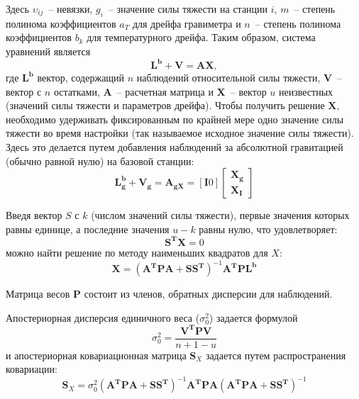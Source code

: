 Здесь $\upsilon_{ij}$~-- невязки, $g_i$~-- значение силы тяжести на станции $i$,
$m$~-- степень полинома коэффициентов $a_T$ для дрейфа гравиметра и $n$~--
степень полинома коэффициентов $b_k$ для температурного дрейфа. Таким образом,
система уравнений является
\begin{equation}
    \mathbf{L}^{\mathbf{b}} + \mathbf{V} = \mathbf{A}\mathbf{X},
\end{equation}
где $\mathbf{L}^{\mathbf{b}}$ вектор, содержащий $n$ наблюдений относительной
силы тяжести, $\mathbf{V}$~-- вектор с $n$ остатками, $\mathbf{A}$~-- расчетная
матрица и $\mathbf{X}$~-- вектор $u$ неизвестных (значений силы тяжести и
параметров дрейфа). Чтобы получить решение $\mathbf{X}$, необходимо удерживать
фиксированным по крайней мере одно значение силы тяжести во время настройки (так
называемое исходное значение силы тяжести).  Здесь это делается путем добавления
наблюдений за абсолютной гравитацией (обычно равной нулю) на базовой станции:
\begin{equation}
    \mathbf{L}^{\mathbf{b}}_{\mathbf{g}} + \mathbf{V}_{\mathbf{g}} =
    \mathbf{A}_{\mathbf{g}\mathbf{X}} =
    \left[\mathbf{I}0\right]
    \left[
        \begin{aligned}
            \mathbf{X}_{\mathbf{g}}\\
            \mathbf{X}_{\mathbf{I}}
        \end{aligned}
    \right]
\end{equation}

Введя вектор $S$ с $k$ (числом значений силы тяжести), первые значения которых равны
единице, а последние значения $u-k$ равны нулю, что удовлетворяет:
\begin{equation}
    \mathbf{S}^{\mathbf{T}}\mathbf{X}=0
\end{equation}
можно найти решение по методу наименьших квадратов для $X$:
\begin{equation}
    \mathbf{X} = \left(\mathbf{A}^{\mathbf{T}}\mathbf{P}\mathbf{A} + \mathbf{S}\mathbf{S}^{\mathbf{T}}\right)^{-1}\mathbf{A}^{\mathbf{T}}\mathbf{P}\mathbf{L}^{\mathbf{b}}
\end{equation}

Матрица весов $\mathbf{P}$ состоит из членов, обратных дисперсии для наблюдений.

Апостериорная дисперсия единичного веса ($\sigma^2_0$) задается формулой
\begin{equation}
    \sigma^2_0 = \frac{\mathbf{V}^{\mathbf{T}}\mathbf{P}\mathbf{V}}{n+1-u}
\end{equation}
и апостериорная ковариационная матрица $\mathbf{S}_X$ задается путем
распространения ковариации:
\begin{equation}
    \mathbf{S}_X = \sigma^2_0\left(\mathbf{A}^{\mathbf{T}}\mathbf{P}\mathbf{A}+\mathbf{S}\mathbf{S}^{\mathbf{T}}\right)^{-1}
    \mathbf{A}^{\mathbf{T}}\mathbf{P}\mathbf{A}\left(\mathbf{A}^{\mathbf{T}}\mathbf{P}\mathbf{A}+\mathbf{S}\mathbf{S}^{\mathbf{T}}\right)^{-1}
\end{equation}

